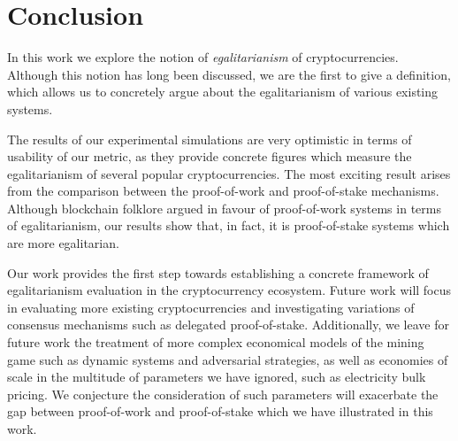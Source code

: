 \section{Conclusion}\label{sec:conclusion}

In this work we explore the notion of \emph{egalitarianism} of
cryptocurrencies. Although this notion has long been discussed, we are the first
to give a definition, which allows us to concretely argue about the
egalitarianism of various existing systems.

The results of our experimental simulations are very optimistic in
terms of usability of our metric, as they provide concrete figures
which measure the egalitarianism of several popular cryptocurrencies.
The most exciting result arises from the comparison between the proof-of-work
and proof-of-stake mechanisms. Although blockchain folklore argued in favour of
proof-of-work systems in terms of egalitarianism,
our results show that, in fact, it is proof-of-stake systems which are more
egalitarian.

Our work provides the first step towards establishing a concrete framework of
egalitarianism evaluation in the cryptocurrency ecosystem. Future work will
focus in evaluating more existing cryptocurrencies and
investigating variations of consensus mechanisms such as delegated
proof-of-stake. Additionally, we leave for future work the treatment of more
complex economical models
of the mining game such as dynamic systems and adversarial strategies, as well
as economies of scale in the multitude of parameters we have ignored, such as
electricity bulk pricing. We conjecture the consideration of such parameters
will exacerbate the gap between proof-of-work and proof-of-stake which we have
illustrated in this work.
